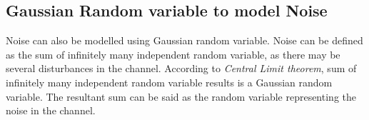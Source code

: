 \documentclass[10pt,twocolumn,letterpaper]{article}
\begin{document}
\subsection{Gaussian Random variable to model Noise}
Noise can also be modelled using Gaussian random variable. Noise can be defined as the sum of infinitely many independent random variable, as there may be several disturbances in the channel. According to \textit{Central Limit theorem}, sum of infinitely many independent random variable results is a Gaussian random variable. The resultant sum can be said as the random variable representing the noise in the channel.













\end{document}
